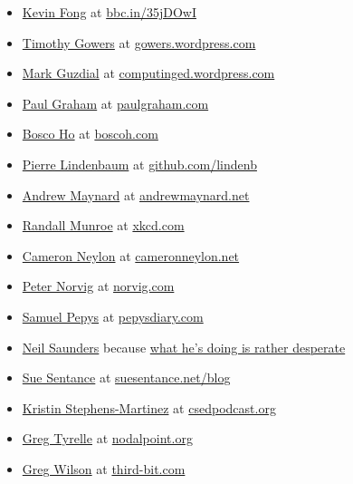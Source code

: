 \documentclass[
]{book}
\begin{document}
\begin{itemize}
\item
  \href{https://en.wikipedia.org/wiki/Kevin_Fong}{Kevin Fong} at \href{https://bbc.in/35jDOwI}{bbc.in/35jDOwI}
\item
  \href{https://en.wikipedia.org/wiki/Timothy_Gowers}{Timothy Gowers} at \href{https://gowers.wordpress.com/}{gowers.wordpress.com}
\item
  \href{https://en.wikipedia.org/wiki/Mark_Guzdial}{Mark Guzdial} at \href{https://computinged.wordpress.com/}{computinged.wordpress.com}
\item
  \href{https://en.wikipedia.org/wiki/Paul_Graham_(programmer)}{Paul Graham} at \href{http://paulgraham.com/}{paulgraham.com}
\item
  \href{https://twitter.com/boscoh}{Bosco Ho} at \href{https://boscoh.com/}{boscoh.com}
\item
  \href{https://twitter.com/yokofakun}{Pierre Lindenbaum} at \href{https://github.com/lindenb}{github.com/lindenb}
\item
  \href{https://en.wikipedia.org/wiki/Andrew_D._Maynard}{Andrew Maynard} at \href{https://andrewmaynard.net}{andrewmaynard.net}
\item
  \href{https://en.wikipedia.org/wiki/Randall_Munroe}{Randall Munroe} at \href{https://xkcd.com/}{xkcd.com}
\item
  \href{https://en.wikipedia.org/wiki/Cameron_Neylon}{Cameron Neylon} at \href{http://cameronneylon.net/}{cameronneylon.net}
\item
  \href{https://en.wikipedia.org/wiki/Peter_Norvig}{Peter Norvig} at \href{https://norvig.com/}{norvig.com}
\item
  \href{https://en.wikipedia.org/wiki/Samuel_Pepys}{Samuel Pepys} at \href{https://www.pepysdiary.com/}{pepysdiary.com}
\item
  \href{https://twitter.com/neilfws}{Neil Saunders} because \href{https://nsaunders.wordpress.com/blog/}{what he's doing is rather desperate}
\item
  \href{https://en.wikipedia.org/wiki/Sue_Sentance}{Sue Sentance} at \href{https://suesentance.net/blog/}{suesentance.net/blog}
\item
  \href{https://users.cs.duke.edu/~ksm/}{Kristin Stephens-Martinez} at \href{https://csedpodcast.org/}{csedpodcast.org}
\item
  \href{http://tyrelle.net/}{Greg Tyrelle} at \href{https://web.archive.org/web/20050616015629/http://www.nodalpoint.org/}{nodalpoint.org}
\item
  \href{https://twitter.com/gvwilson}{Greg Wilson} at \href{https://third-bit.com/}{third-bit.com}
\end{itemize}
\end{document}
